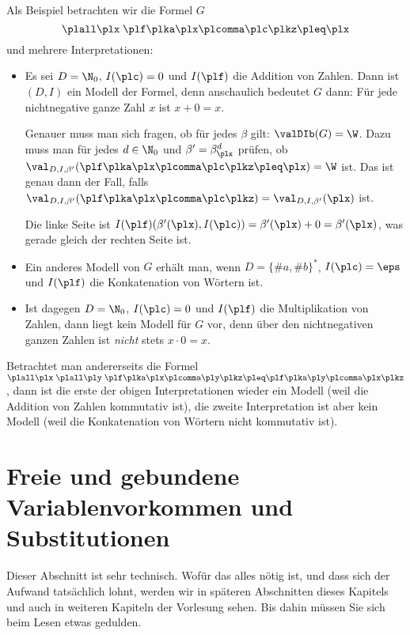 Als Beispiel betrachten wir die Formel $G$
\[
   \plall \plx \; \plf\plka\plx \plcomma\plc\plkz \pleq \plx
\]
und mehrere Interpretationen:
\begin{itemize}
\item Es sei $D=\N_0$, $I(\plc)=0$ und $I(\plf)$ die Addition von
  Zahlen.
  Dann ist $(D,I)$ ein Modell der Formel, denn anschaulich bedeutet
  $G$ dann: Für jede nichtnegative ganze Zahl $x$ ist $x+0=x$.
  
  Genauer muss man sich fragen, ob für jedes $\beta$ gilt:
  $\valDIb(G)=\W$.
  Dazu muss man für jedes $d\in\N_0$ und $\beta'=\beta_{\plx}^d$
  prüfen, ob
  $\val_{D,I,\beta'}(\plf\plka\plx \plcomma\plc\plkz \pleq \plx) =\W$
  ist.
  Das ist genau dann der Fall, falls
  $\val_{D,I,\beta'}(\plf\plka\plx \plcomma\plc\plkz) =
  \val_{D,I,\beta'}(\plx)$ ist.

  Die linke Seite ist
  $I(\plf)(\beta'(\plx), I(\plc)) = \beta'(\plx)+0=\beta'(\plx)$, was
  gerade gleich der rechten Seite ist.
\item Ein anderes Modell von $G$ erhält man, wenn $D=\{\#a,\#b\}^*$,
  $I(\plc)=\eps$ und $I(\plf)$ die Konkatenation von Wörtern ist.
\item Ist dagegen $D=\N_0$, $I(\plc)=0$ und $I(\plf)$ die
  Multiplikation von Zahlen, dann liegt kein Modell für $G$ vor, denn
  über den nichtnegativen ganzen Zahlen ist \emph{nicht} stets
  $x\cdot 0=x$.
\end{itemize}
%
Betrachtet man andererseits die Formel
$\plall \plx\; \plall\ply\; \plf\plka\plx\plcomma\ply\plkz \pleq
\plf\plka\ply\plcomma\plx\plkz$, dann ist die erste der obigen
Interpretationen wieder ein Modell (weil die Addition von Zahlen
kommutativ ist), die zweite Interpretation ist aber kein Modell (weil
die Konkatenation von Wörtern nicht kommutativ ist).

\Tut\section{Freie und gebundene Variablenvorkommen und Substitutionen}
\label{sec:praedikatenlogik-frei-geb-subst}

Dieser Abschnitt ist sehr technisch.
%
Wofür das alles nötig ist, und dass sich der Aufwand tatsächlich
lohnt, werden wir in späteren Abschnitten dieses Kapitels und auch in
weiteren Kapiteln der Vorlesung sehen.
%
Bis dahin müssen Sie sich beim Lesen etwas gedulden.

